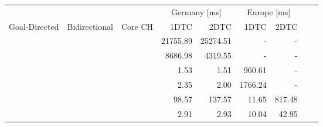 \begin{tabular}{cccrrrrrr}
	\toprule
	              &               &         & \multicolumn{2}{c}{Germany [\si{\milli\second}]} & \multicolumn{2}{c}{Europe [\si{\milli\second}]}               \\
	Goal-Directed & Bidirectional & Core CH & 1DTC                                             & 2DTC                                            & 1DTC & 2DTC \\
	\midrule
	\xmark        & \xmark        & \xmark  & 21755.89                                                & 25274.51                                               & -    & -    \\
	\xmark        & \cmark        & \xmark  & 8686.98                                                & 4319.55                                               & -    & -    \\
	\cmark        & \xmark        & \xmark  & 1.53                                                & 1.51                                               & 960.61    & -    \\
	\cmark        & \cmark        & \xmark  & 2.35                                                & 2.00                                               & 1766.24    & -    \\
	\xmark        & \cmark        & \cmark  & 98.57                                                & 137.57                                               & 11.65    & 817.48    \\
	\cmark        & \cmark        & \cmark  & 2.91                                                & 2.93                                               & 10.04    & 42.95    \\
	\bottomrule
\end{tabular}
